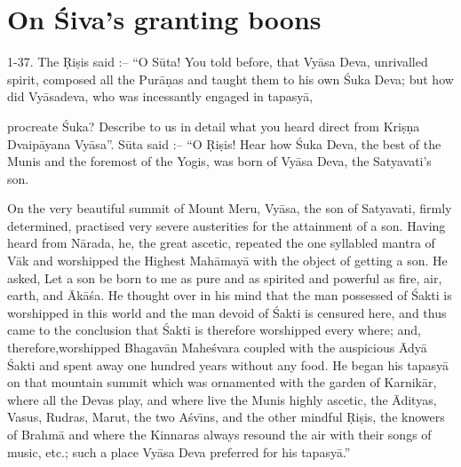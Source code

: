 \chapter{On \'Siva's granting boons}

1-37. The \d{R}i\d{s}is said :-- ``O S\=uta! You told before, that Vy\=asa Deva, unrivalled spirit, composed all the Pur\=a\d{n}as and taught them to his own \'Suka Deva; but how did Vy\=asadeva, who was incessantly engaged in tapasy\=a,

procreate \'Suka? Describe to us in detail what you heard direct from Kri\d{s}\d{n}a Dvaip\=ayana Vy\=asa''. S\=uta said :-- ``O \d{R}i\d{s}is! Hear how \'Suka Deva, the best of the Munis and the foremost of the Yogis, was born of Vy\=asa Deva, the Satyavati's son.

On the very beautiful summit of Mount Meru, Vy\=asa, the son of Satyavati, firmly determined, practised very severe austerities for the attainment of a son. Having heard from N\=arada, he, the great ascetic, repeated the one syllabled mantra of V\=ak and worshipped the Highest Mah\=amay\=a with the object of getting a son. He asked, Let a son be born to me as pure and as spirited and powerful as fire, air, earth, and \=Ak\=a\'sa. He thought over in his mind that the man possessed of \'Sakti is worshipped in this world and the man devoid of \'Sakti is censured here, and thus came to the conclusion that \'Sakti is therefore worshipped every where; and, therefore,worshipped Bhagav\=an Mahe\'svara coupled with the auspicious \=Ady\=a \'Sakti and spent away one hundred years without any food. He began his tapasy\=a on that mountain summit which was ornamented with the garden of Karnik\=ar, where all the Devas play, and where live the Munis highly ascetic, the \=Adityas, Vasus, Rudras, Marut, the two A\'sv\={\i}ns, and the other mindful \d{R}i\d{s}is, the knowers of Brahm\=a and where the Kinnaras always resound the air with their songs of music, etc.; such a place Vy\=asa Deva preferred for his tapasy\=a.''

